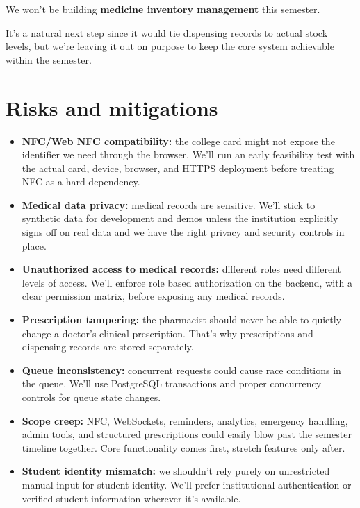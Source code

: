 \documentclass[11pt,a4paper]{article}
\begin{document}
We won't be building \textbf{medicine inventory management} this semester.

It's a natural next step since it would tie dispensing records to actual stock levels, but we're leaving it out on purpose to keep the core system achievable within the semester.


\section{Risks and mitigations}

\begin{itemize}
    \item \textbf{NFC/Web NFC compatibility:} the college card might not expose the identifier we need through the browser. We'll run an early feasibility test with the actual card, device, browser, and HTTPS deployment before treating NFC as a hard dependency.
    \item \textbf{Medical data privacy:} medical records are sensitive. We'll stick to synthetic data for development and demos unless the institution explicitly signs off on real data and we have the right privacy and security controls in place.
    \item \textbf{Unauthorized access to medical records:} different roles need different levels of access. We'll enforce role based authorization on the backend, with a clear permission matrix, before exposing any medical records.
    \item \textbf{Prescription tampering:} the pharmacist should never be able to quietly change a doctor's clinical prescription. That's why prescriptions and dispensing records are stored separately.
    \item \textbf{Queue inconsistency:} concurrent requests could cause race conditions in the queue. We'll use PostgreSQL transactions and proper concurrency controls for queue state changes.
    \item \textbf{Scope creep:} NFC, WebSockets, reminders, analytics, emergency handling, admin tools, and structured prescriptions could easily blow past the semester timeline together. Core functionality comes first, stretch features only after.
    \item \textbf{Student identity mismatch:} we shouldn't rely purely on unrestricted manual input for student identity. We'll prefer institutional authentication or verified student information wherever it's available.

\end{itemize}
\end{document}

